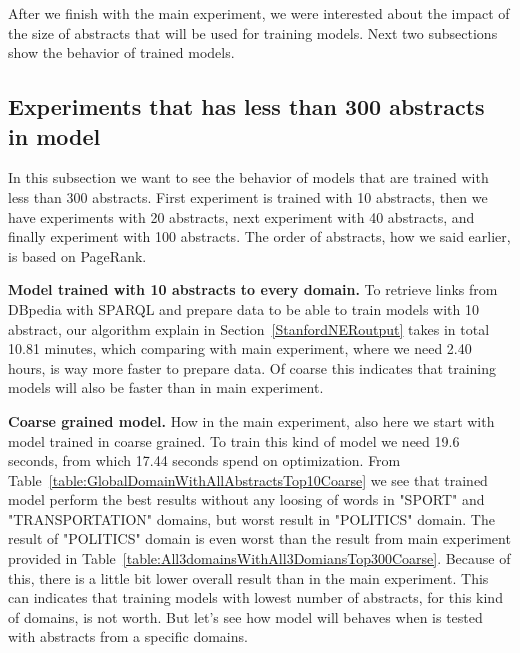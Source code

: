 \documentclass[thesis=M,english]{FITthesis}[2018/05/30]
\begin{document}
	After we finish with the main experiment, we were interested about the impact of the size of abstracts that will be used for training models. Next two subsections show the behavior of trained models.     
\subsection{Experiments that has less than 300 abstracts in model}\label{}
	In this subsection we want to see the behavior of models that are trained with less than 300 abstracts. First experiment is trained with 10 abstracts, then we have experiments with 20 abstracts, next experiment with 40 abstracts, and finally experiment with 100 abstracts. The order of abstracts, how we said earlier, is based on PageRank.
	
	\textbf{Model trained with 10 abstracts to every domain.} To retrieve links from DBpedia with SPARQL and prepare data to be able to train models with 10 abstract, our algorithm explain in Section~\ref{StanfordNERoutput} takes in total 10.81 minutes, which comparing with main experiment, where we need 2.40 hours, is way more faster to prepare data. Of coarse this indicates that training models will also be faster than in main experiment.
	
	\textbf{Coarse grained model.} How in the main experiment, also here we start with model trained in coarse grained. To train this kind of model we need 19.6 seconds, from which 17.44 seconds spend on optimization. From Table~\ref{table:GlobalDomainWithAllAbstractsTop10Coarse} we see that trained model perform the best results without any loosing of words in "SPORT" and "TRANSPORTATION" domains, but worst result in "POLITICS" domain. The result of "POLITICS" domain is even worst than the result from main experiment provided in Table~\ref{table:All3domainsWithAll3DomiansTop300Coarse}. Because of this, there is a little bit lower overall result than in the main experiment. This can indicates that training models with lowest number of abstracts, for this kind of domains, is not worth. But let's see how model will behaves when is tested with abstracts from a specific domains.
	
\end{document}
